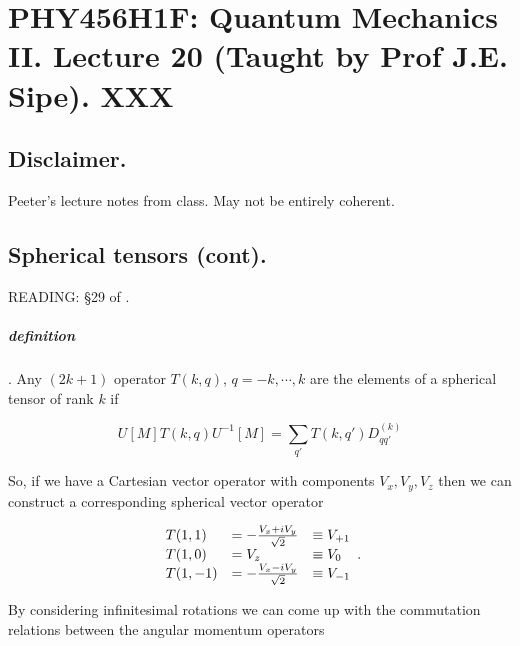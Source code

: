
%

\chapter{PHY456H1F: Quantum Mechanics II.  Lecture 20 (Taught by Prof J.E. Sipe).  XXX}
\label{chap:qmTwoL20}
{}
\date{Nov 21, 2011}

\beginArtWithToc

\section{Disclaimer.}

Peeter's lecture notes from class.  May not be entirely coherent.

\section{Spherical tensors (cont).}

READING: \S 29 of \cite{desai2009quantum}.

\paragraph{definition}.  Any $(2k + 1)$ operator $T(k, q)$, $q = -k, \cdots, k$ are the elements of a spherical tensor of rank $k$ if

\begin{equation}\label{eqn:qmTwoL20:10}
U[M] T(k, q) U^{-1}[M]
= \sum_{q'} T(k, q') D^{(k)}_{q q'}
\end{equation}

So, if we have a Cartesian vector operator with components $V_x, V_y, V_z$ then we can construct a corresponding spherical vector operator

\begin{equation}\label{eqn:qmTwoL20:30}
\begin{array}{l l l}
T(1, 1) &= - \frac{V_x + i V_y}{\sqrt{2}} &\equiv V_{+1} \\
T(1, 0) &= V_z &\equiv V_0 \\
T(1, -1) &= - \frac{V_x - i V_y}{\sqrt{2}} &\equiv V_{-1}
\end{array}.
\end{equation}

By considering infinitesimal rotations we can come up with the commutation relations between the angular momentum operators

